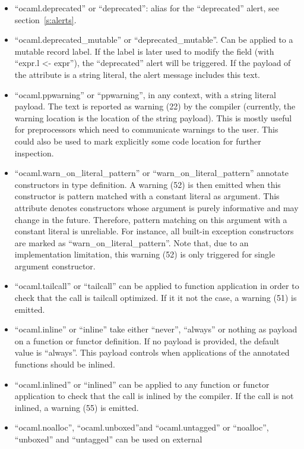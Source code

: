 \begin{itemize}
\item
  ``ocaml.deprecated'' or ``deprecated'': alias for the
  ``deprecated'' alert, see section~\ref{s:alerts}.
\item
  ``ocaml.deprecated_mutable'' or ``deprecated_mutable''.
  Can be applied to a mutable record label.  If the label is later
  used to modify the field (with ``expr.l <- expr''), the ``deprecated'' alert
  will be triggered.  If the payload of the attribute is a string literal,
  the alert message includes this text.
\item
  ``ocaml.ppwarning'' or ``ppwarning'', in any context, with
  a string literal payload.  The text is reported as warning (22)
  by the compiler (currently, the warning location is the location
  of the string payload).  This is mostly useful for preprocessors which
  need to communicate warnings to the user.  This could also be used
  to mark explicitly some code location for further inspection.
\item
  ``ocaml.warn_on_literal_pattern'' or ``warn_on_literal_pattern'' annotate
  constructors in type definition. A warning (52) is then emitted when this
  constructor is pattern matched with a constant literal as argument. This
  attribute denotes constructors whose argument is purely informative and
  may change in the future. Therefore, pattern matching on this argument
  with a constant literal is unreliable. For instance, all built-in exception
  constructors are marked as ``warn_on_literal_pattern''.
  Note that, due to an implementation limitation, this warning (52) is only
  triggered for single argument constructor.
\item
  ``ocaml.tailcall'' or ``tailcall'' can be applied to function
  application in order to check that the call is tailcall optimized.
  If it it not the case, a warning (51) is emitted.
\item
  ``ocaml.inline'' or ``inline'' take either ``never'', ``always''
  or nothing as payload on a function or functor definition. If no payload
  is provided, the default value is ``always''. This payload controls when
  applications of the annotated functions should be inlined.
\item
  ``ocaml.inlined'' or ``inlined'' can be applied to any function or functor
  application to check that the call is inlined by the compiler. If the call
  is not inlined, a warning (55) is emitted.
\item
  ``ocaml.noalloc'', ``ocaml.unboxed''and ``ocaml.untagged'' or
  ``noalloc'', ``unboxed'' and ``untagged'' can be used on external

\end{itemize}
